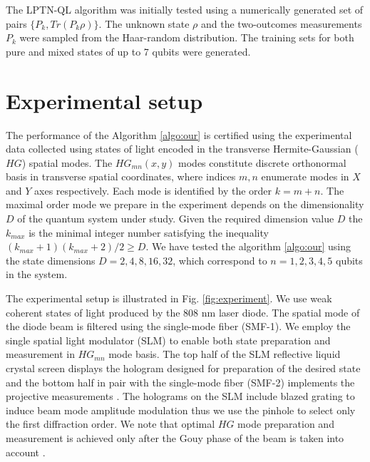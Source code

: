 \documentclass[%
 reprint,
 amsmath,amssymb,
 aps,
]{revtex4-2}
\begin{document}
The LPTN-QL algorithm was initially tested using a numerically generated set of pairs $\{P_{k}, Tr(P_{k}\rho)\}$. The unknown state $\rho$ and the two-outcomes measurements $P_{k}$ were sampled from the Haar-random distribution. The training sets for both pure and mixed states of up to 7 qubits were generated. 



\section{\label{sec:exp}Experimental setup}

The performance of the Algorithm \ref{algo:our} is certified using the experimental data collected using states of light encoded in the transverse Hermite-Gaussian ($HG$) spatial modes. The $HG_{mn}(x,y)$ modes constitute discrete orthonormal basis in transverse spatial coordinates, where indices $m,n$ enumerate modes in $X$ and $Y$ axes respectively. Each mode is identified by the order $k = m+n$. The maximal order mode we prepare in the experiment depends on the dimensionality $D$ of the quantum system under study. Given the required dimension value $D$ the $k_{max}$ is the minimal integer number satisfying the inequality $(k_{max}+1)(k_{max}+2)/2 \geq D$. We have tested the algorithm \ref{algo:our} using the state dimensions $D =2,4,8,16,32$, which correspond to $n=1,2,3,4,5$ qubits in the system.

The experimental setup is illustrated in Fig. \ref{fig:experiment}. We use weak coherent states of light produced by the 808 nm laser diode. The spatial mode of the diode beam is filtered using the single-mode fiber (SMF-1). We employ the single spatial light modulator (SLM) to enable both state preparation and measurement in $HG_{mn}$ mode basis. The top half of the SLM reflective liquid crystal screen displays the hologram designed for preparation of the desired state and the bottom half in pair with the single-mode fiber (SMF-2) implements the projective measurements \cite{Bent2015, Palmieri2020}. The holograms on the SLM include blazed grating to induce beam mode amplitude modulation \cite{Bolduc2013} thus we use the pinhole to select only the first diffraction order. We note that optimal $HG$ mode preparation and measurement is achieved only after the Gouy phase of the beam is taken into account \cite{Struchalin2020}.
\end{document}
